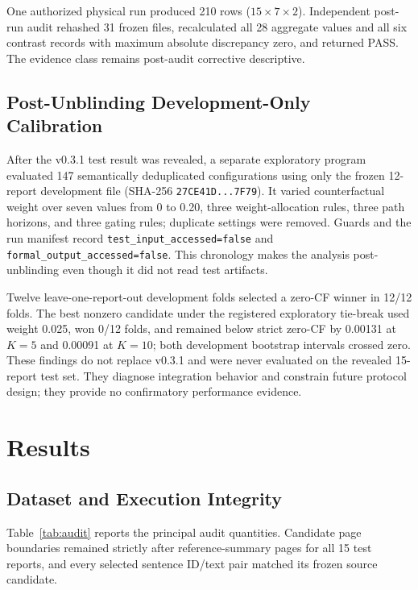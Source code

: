 \documentclass[applsci,article,submit,moreauthors]{Definitions/mdpi}
\begin{document}
One authorized physical run produced 210 rows ($15\times7\times2$). Independent post-run audit rehashed 31 frozen files, recalculated all 28 aggregate values and all six contrast records with maximum absolute discrepancy zero, and returned PASS. The evidence class remains post-audit corrective descriptive.

\subsection{Post-Unblinding Development-Only Calibration}

After the v0.3.1 test result was revealed, a separate exploratory program evaluated 147 semantically deduplicated configurations using only the frozen 12-report development file (SHA-256 \texttt{27CE41D...7F79}). It varied counterfactual weight over seven values from 0 to 0.20, three weight-allocation rules, three path horizons, and three gating rules; duplicate settings were removed. Guards and the run manifest record \texttt{test\_input\_accessed=false} and \texttt{formal\_output\_accessed=false}. This chronology makes the analysis post-unblinding even though it did not read test artifacts.

Twelve leave-one-report-out development folds selected a zero-CF winner in 12/12 folds. The best nonzero candidate under the registered exploratory tie-break used weight 0.025, won 0/12 folds, and remained below strict zero-CF by 0.00131 at $K=5$ and 0.00091 at $K=10$; both development bootstrap intervals crossed zero. These findings do not replace v0.3.1 and were never evaluated on the revealed 15-report test set. They diagnose integration behavior and constrain future protocol design; they provide no confirmatory performance evidence.

\section{Results}

\subsection{Dataset and Execution Integrity}

Table~\ref{tab:audit} reports the principal audit quantities. Candidate page boundaries remained strictly after reference-summary pages for all 15 test reports, and every selected sentence ID/text pair matched its frozen source candidate.
\end{document}
